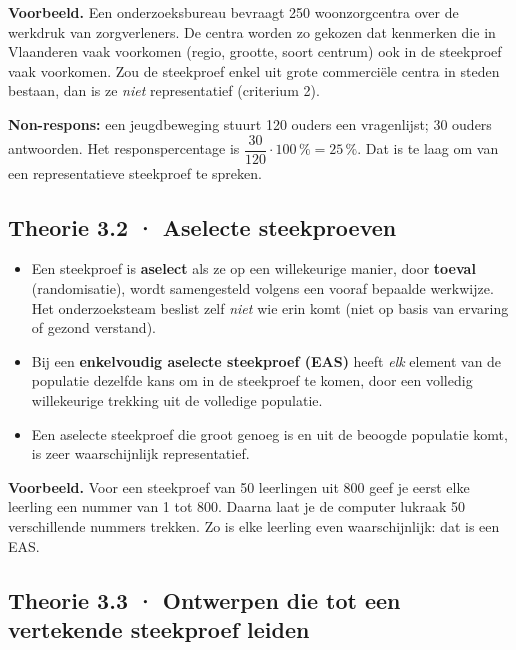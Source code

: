 \begin{voorbeeld}
\textbf{Voorbeeld.} Een onderzoeksbureau bevraagt 250 woonzorgcentra over de werkdruk van zorgverleners. De centra worden zo gekozen dat kenmerken die in Vlaanderen vaak voorkomen (regio, grootte, soort centrum) ook in de steekproef vaak voorkomen. Zou de steekproef enkel uit grote commerciële centra in steden bestaan, dan is ze \emph{niet} representatief (criterium 2).

\textbf{Non-respons:} een jeugdbeweging stuurt 120 ouders een vragenlijst; 30 ouders antwoorden. Het responspercentage is $\dfrac{30}{120}\cdot 100\,\%=25\,\%$. Dat is te laag om van een representatieve steekproef te spreken.
\end{voorbeeld}

\subsection*{Theorie 3.2 · Aselecte steekproeven}

\begin{theorie}
\begin{itemize}
\item Een steekproef is \textbf{aselect} als ze op een willekeurige manier, door \textbf{toeval} (randomisatie), wordt samengesteld volgens een vooraf bepaalde werkwijze. Het onderzoeksteam beslist zelf \emph{niet} wie erin komt (niet op basis van ervaring of gezond verstand).
\item Bij een \textbf{enkelvoudig aselecte steekproef (EAS)} heeft \emph{elk} element van de populatie dezelfde kans om in de steekproef te komen, door een volledig willekeurige trekking uit de volledige populatie.
\item Een aselecte steekproef die groot genoeg is en uit de beoogde populatie komt, is zeer waarschijnlijk representatief.
\end{itemize}
\end{theorie}

\begin{voorbeeld}
\textbf{Voorbeeld.} Voor een steekproef van 50 leerlingen uit 800 geef je eerst elke leerling een nummer van 1 tot 800. Daarna laat je de computer lukraak 50 verschillende nummers trekken. Zo is elke leerling even waarschijnlijk: dat is een EAS.
\end{voorbeeld}

\subsection*{Theorie 3.3 · Ontwerpen die tot een vertekende steekproef leiden}

